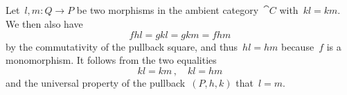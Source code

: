 \subsection{}

Let~$l, m \colon Q \to P$ be two morphisms in the ambient category~$\cat{C}$ with~$k l = k m$.
We then also have
\[
	f h l = g k l = g k m = f h m
\]
by the commutativity of the pullback square, and thus~$h l = h m$ because~$f$ is a monomorphism.
It follows from the two equalities
\[
	k l = k m \,,
	\quad
	k l = h m
\]
and the universal property of the pullback~$(P, h, k)$ that~$l = m$.
